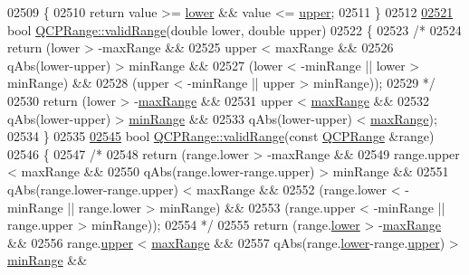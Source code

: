 \begin{DoxyCode}
02509 \textcolor{keyword}{}\{
02510   \textcolor{keywordflow}{return} value >= \hyperlink{a00049_aa3aca3edb14f7ca0c85d912647b91745}{lower} && value <= \hyperlink{a00049_ae44eb3aafe1d0e2ed34b499b6d2e074f}{upper};
02511 \}
02512 
\hypertarget{a00115_source_l02521}{}\hyperlink{a00049_ab38bd4841c77c7bb86c9eea0f142dcc0}{02521} \textcolor{keywordtype}{bool} \hyperlink{a00049_ab38bd4841c77c7bb86c9eea0f142dcc0}{QCPRange::validRange}(\textcolor{keywordtype}{double} lower, \textcolor{keywordtype}{double} upper)
02522 \{
02523   \textcolor{comment}{/*}
02524 \textcolor{comment}{  return (lower > -maxRange &&}
02525 \textcolor{comment}{          upper < maxRange &&}
02526 \textcolor{comment}{          qAbs(lower-upper) > minRange &&}
02527 \textcolor{comment}{          (lower < -minRange || lower > minRange) &&}
02528 \textcolor{comment}{          (upper < -minRange || upper > minRange));}
02529 \textcolor{comment}{          */}
02530   \textcolor{keywordflow}{return} (lower > -\hyperlink{a00049_a5ca51e7a2dc5dc0d49527ab171fe1f4f}{maxRange} &&
02531           upper < \hyperlink{a00049_a5ca51e7a2dc5dc0d49527ab171fe1f4f}{maxRange} &&
02532           qAbs(lower-upper) > \hyperlink{a00049_ab46d3bc95030ee25efda41b89e2b616b}{minRange} &&
02533           qAbs(lower-upper) < \hyperlink{a00049_a5ca51e7a2dc5dc0d49527ab171fe1f4f}{maxRange});
02534 \}
02535 
\hypertarget{a00115_source_l02545}{}\hyperlink{a00049_a801b964752eaad6219be9d8a651ec2b3}{02545} \textcolor{keywordtype}{bool} \hyperlink{a00049_ab38bd4841c77c7bb86c9eea0f142dcc0}{QCPRange::validRange}(\textcolor{keyword}{const} \hyperlink{a00049}{QCPRange} &range)
02546 \{
02547   \textcolor{comment}{/*}
02548 \textcolor{comment}{  return (range.lower > -maxRange &&}
02549 \textcolor{comment}{          range.upper < maxRange &&}
02550 \textcolor{comment}{          qAbs(range.lower-range.upper) > minRange &&}
02551 \textcolor{comment}{          qAbs(range.lower-range.upper) < maxRange &&}
02552 \textcolor{comment}{          (range.lower < -minRange || range.lower > minRange) &&}
02553 \textcolor{comment}{          (range.upper < -minRange || range.upper > minRange));}
02554 \textcolor{comment}{          */}
02555   \textcolor{keywordflow}{return} (range.\hyperlink{a00049_aa3aca3edb14f7ca0c85d912647b91745}{lower} > -\hyperlink{a00049_a5ca51e7a2dc5dc0d49527ab171fe1f4f}{maxRange} &&
02556           range.\hyperlink{a00049_ae44eb3aafe1d0e2ed34b499b6d2e074f}{upper} < \hyperlink{a00049_a5ca51e7a2dc5dc0d49527ab171fe1f4f}{maxRange} &&
02557           qAbs(range.\hyperlink{a00049_aa3aca3edb14f7ca0c85d912647b91745}{lower}-range.\hyperlink{a00049_ae44eb3aafe1d0e2ed34b499b6d2e074f}{upper}) > \hyperlink{a00049_ab46d3bc95030ee25efda41b89e2b616b}{minRange} &&

\end{DoxyCode}
